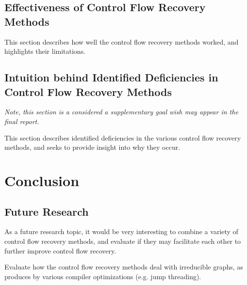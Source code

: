 \documentclass[12pt, a4paper]{article}
\begin{document}

\subsection{Effectiveness of Control Flow Recovery Methods}

This section describes how well the control flow recovery methods worked, and highlights their limitations.

\subsection{Intuition behind Identified Deficiencies in Control Flow Recovery Methods}

\textit{Note, this section is a considered a supplementary goal wish may appear in the final report.}

This section describes identified deficiencies in the various control flow recovery methods, and seeks to provide insight into why they occur.

\clearpage

\section{Conclusion}

\subsection{Future Research}

As a future research topic, it would be very interesting to combine a variety of control flow recovery methods, and evaluate if they may facilitate each other to further improve control flow recovery.

Evaluate how the control flow recovery methods deal with irreducible graphs, as produces by various compiler optimizations (e.g. jump threading).

\clearpage


\end{document}
